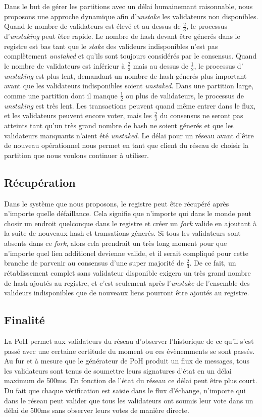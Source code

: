 \documentclass[12pt]{article}
\begin{document}
Dans le but de gérer les partitions avec un délai humainemant raisonnable, nous proposons une approche dynamique afin d'\textit{unstake} les validateurs non disponibles. Quand le nombre de validateurs est élevé et au dessus de \(\frac{2}{3}\), le processus d'\textit{unstaking} peut être rapide. Le nombre de hash devant être génerés dans le registre est bas tant que le \textit{stake} des valideurs indisponibles n'est pas complètement \textit{unstaked} et qu'ils sont toujours considérés par le consensus. Quand le nombre de validateurs est inférieur à \(\frac{2}{3}\) mais au dessus de  \(\frac{1}{2}\), le processus d' \textit{unstaking} est plus lent, demandant un nombre de hash génerés plus important avant que les validateurs indisponibles soient \textit{unstaked}. Dans une partition large, comme une partition dont il manque \(\frac{1}{2}\) ou plus de validateurs, le processus de \textit{unstaking} est très lent. Les transactions peuvent quand même entrer dans le flux, et les validateurs peuvent encore voter, mais les \(\frac{2}{3}\) du consensus ne seront pas atteints tant qu'un très grand nombre de hash ne soient génerés et que les validateurs manquants n'aient été \textit{unstaked}. Le délai pour un réseau avant d'être de nouveau opérationnel nous permet en tant que client du réseau de choisir la partition que nous voulons continuer à utiliser.

\subsection{Récupération}\label{disponibility}
Dans le système que nous proposons, le registre peut être récupéré après n'importe quelle défaillance. Cela signifie que n'importe qui dans le monde peut chosir un endroit quelconque dans le registre et créer un \textit{fork} valide en ajoutant à la suite de nouveaux hash et transations génerés. Si tous les validateurs sont absents dans ce \textit{fork}, alors cela prendrait un très long moment pour que n'importe quel lien additionel devienne valide, et il serait compliqué pour cette branche de parvenir au consensus d'une super majorité de \(\frac{2}{3}\). De ce fait, un rétablissement complet sans validateur disponible exigera un très grand nombre de hash ajoutés au registre, et c'est seulement après l'\textit{unstake} de l'ensemble des valideurs indisponibles que de nouveaux liens pourront être ajoutés au registre.

\subsection{Finalité}\label{disponibility}
La PoH permet aux validateurs du réseau d'observer l'historique de ce qu'il s'est passé avec une certaine certitude du moment ou ces évènemments se sont passés. Au fur et à mesure que le générateur de PoH produit un flux de messages, tous les validateurs sont tenus de soumettre leurs signatures d'état en un délai maximum de 500ms. En fonction de l'état du réseau ce délai peut être plus court. Du fait que chaque vérification est saisie dans le flux d'échange, n'importe qui dans le réseau peut valider que tous les validateurs ont soumis leur vote dans un délai de 500ms sans observer leurs votes de manière directe.
\end{document}
